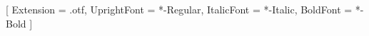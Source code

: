 




\setsansfont{LibertinusSans}[
  Extension = {.otf}, %
  UprightFont = *-Regular,
  ItalicFont  = *-Italic,
  BoldFont    = *-Bold
]

